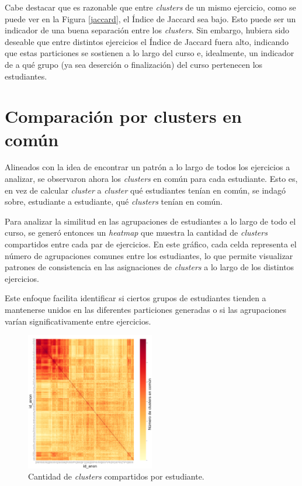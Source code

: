 \documentclass[11pt,a4paper,twoside,openany]{tesis}
\begin{document}
Cabe destacar que es razonable que entre \emph{clusters} de un mismo ejercicio, como se puede ver en la Figura \ref{jaccard}, el Índice de Jaccard sea bajo. Esto puede ser un indicador de una buena separación entre los \emph{clusters}. Sin embargo, hubiera sido deseable que entre distintos ejercicios el Índice de Jaccard fuera alto, indicando que estas particiones se sostienen a lo largo del curso e, idealmente, un indicador de a qué grupo (ya sea deserción o finalización) del curso pertenecen los estudiantes. 

\section{Comparación por clusters en común}

Alineados con la idea de encontrar un patrón a lo largo de todos los ejercicios a analizar, se observaron ahora los \emph{clusters} en común para cada estudiante. Esto es, en vez de calcular \emph{cluster} a \emph{cluster} qué estudiantes tenían en común, se indagó sobre, estudiante a estudiante, qué \emph{clusters} tenían en común. 

Para analizar la similitud en las agrupaciones de estudiantes a lo largo de todo el curso, se generó entonces un \emph{heatmap} que muestra la cantidad de \emph{clusters} compartidos entre cada par de ejercicios. En este gráfico, cada celda representa el número de agrupaciones comunes entre los estudiantes, lo que permite visualizar patrones de consistencia en las asignaciones de \emph{clusters} a lo largo de los distintos ejercicios. 

Este enfoque facilita identificar si ciertos grupos de estudiantes tienden a mantenerse unidos en las diferentes particiones generadas o si las agrupaciones varían significativamente entre ejercicios.

\begin{figure}[H]

    \centering
    \includegraphics[width=0.5\textwidth]{imagenes/cluster.png}
    \caption{Cantidad de \emph{clusters} compartidos por estudiante.}
    \label{cluster}
\end{figure}
\end{document}
